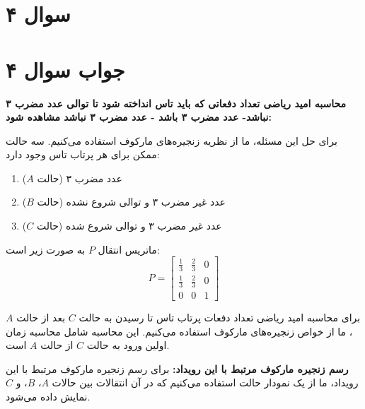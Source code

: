 \section*{سوال ۴}



\section*{جواب سوال ۴}

\textbf{محاسبه امید ریاضی تعداد دفعاتی که باید تاس انداخته شود تا توالی عدد مضرب ۳ نباشد- عدد مضرب ۳ باشد - عدد مضرب ۳ نباشد مشاهده شود:}

برای حل این مسئله، ما از نظریه زنجیره‌های مارکوف استفاده می‌کنیم. سه حالت ممکن برای هر پرتاب تاس وجود دارد:
\begin{enumerate}
	\item عدد مضرب ۳ (حالت \(A\))
	\item عدد غیر مضرب ۳ و توالی شروع نشده (حالت \(B\))
	\item عدد غیر مضرب ۳ و توالی شروع شده (حالت \(C\))
\end{enumerate}

ماتریس انتقال \(P\) به صورت زیر است:
\[ P = \begin{bmatrix}
	\frac{1}{3} & \frac{2}{3} & 0 \\
	\frac{1}{3} & \frac{2}{3} & 0 \\
	0 & 0 & 1
\end{bmatrix} \]

برای محاسبه امید ریاضی تعداد دفعات پرتاب تاس تا رسیدن به حالت \(C\) بعد از حالت \(A\)، ما از خواص زنجیره‌های مارکوف استفاده می‌کنیم. این محاسبه شامل محاسبه زمان اولین ورود به حالت \(C\) از حالت \(A\) است.

\textbf{رسم زنجیره مارکوف مرتبط با این رویداد:}
برای رسم زنجیره مارکوف مرتبط با این رویداد، ما از یک نمودار حالت استفاده می‌کنیم که در آن انتقالات بین حالات \(A\)، \(B\)، و \(C\) نمایش داده می‌شود.
